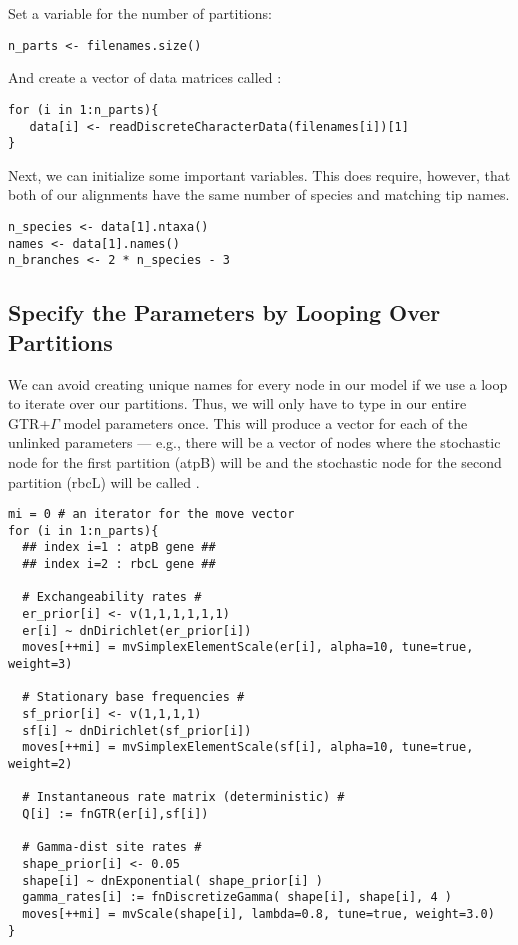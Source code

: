 Set a variable for the number of partitions:
{\tt \begin{snugshade*}
\begin{lstlisting}
n_parts <- filenames.size()
\end{lstlisting}
\end{snugshade*}}

And create a vector of data matrices called :
{\tt \begin{snugshade*}
\begin{lstlisting}
for (i in 1:n_parts){
   data[i] <- readDiscreteCharacterData(filenames[i])[1]
}
\end{lstlisting}
\end{snugshade*}}

Next, we can initialize some important variables. This does require, however, that both of our alignments have the same number of species and matching tip names.
{\tt \begin{snugshade*}
\begin{lstlisting}
n_species <- data[1].ntaxa()
names <- data[1].names()
n_branches <- 2 * n_species - 3
\end{lstlisting}
\end{snugshade*}}


\subsection{Specify the Parameters by Looping Over Partitions}

We can avoid creating unique names for every node in our model if we use a  loop to iterate over our partitions. Thus, we will only have to type in our entire GTR+$\Gamma$ model parameters once. 
This will produce a vector for each of the unlinked parameters --- e.g., there will be a vector of  nodes where the stochastic node for the first partition (atpB) will be  and the stochastic node for the second partition (rbcL) will be called .
{\tt \small \begin{snugshade*}
\begin{lstlisting}
mi = 0 # an iterator for the move vector
for (i in 1:n_parts){
  ## index i=1 : atpB gene ##
  ## index i=2 : rbcL gene ##
  
  # Exchangeability rates #
  er_prior[i] <- v(1,1,1,1,1,1)
  er[i] ~ dnDirichlet(er_prior[i])
  moves[++mi] = mvSimplexElementScale(er[i], alpha=10, tune=true, weight=3) 

  # Stationary base frequencies #
  sf_prior[i] <- v(1,1,1,1)
  sf[i] ~ dnDirichlet(sf_prior[i])
  moves[++mi] = mvSimplexElementScale(sf[i], alpha=10, tune=true, weight=2) 

  # Instantaneous rate matrix (deterministic) #
  Q[i] := fnGTR(er[i],sf[i]) 

  # Gamma-dist site rates #
  shape_prior[i] <- 0.05 
  shape[i] ~ dnExponential( shape_prior[i] )
  gamma_rates[i] := fnDiscretizeGamma( shape[i], shape[i], 4 )
  moves[++mi] = mvScale(shape[i], lambda=0.8, tune=true, weight=3.0)
}
\end{lstlisting}
\end{snugshade*}}


